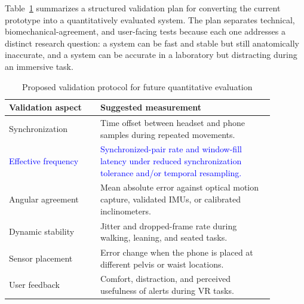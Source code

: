 \documentclass[conference]{IEEEtran}
\newcommand{\CC}[1]{\textcolor{blue}{#1}}
\begin{document}
Table~\ref{tab:validation_plan} summarizes a structured validation plan for converting the
current prototype into a quantitatively evaluated system. The plan separates technical,
biomechanical-agreement, and user-facing tests because each one addresses a distinct
research question: a system can be fast and stable but still anatomically inaccurate, and
a system can be accurate in a laboratory but distracting during an immersive task.

\begin{table}[t]
\caption{Proposed validation protocol for future quantitative evaluation}
\label{tab:validation_plan}
\centering
\renewcommand{\arraystretch}{1.15}
\begin{tabular}{p{0.30\linewidth}p{0.58\linewidth}}
\toprule
Validation aspect & Suggested measurement \\
\midrule
Synchronization   & Time offset between headset and phone samples during repeated
  movements. \\
\CC{Effective frequency} & \CC{Synchronized-pair rate and window-fill latency under
  reduced synchronization tolerance and/or temporal resampling.} \\
Angular agreement & Mean absolute error against optical motion capture, validated
  IMUs, or calibrated inclinometers. \\
Dynamic stability & Jitter and dropped-frame rate during walking, leaning, and seated
  tasks. \\
Sensor placement  & Error change when the phone is placed at different pelvis or waist
  locations. \\
User feedback     & Comfort, distraction, and perceived usefulness of alerts during
  VR tasks. \\
\bottomrule
\end{tabular}
\end{table}
\end{document}
